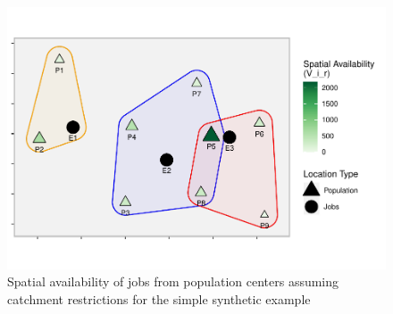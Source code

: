 \documentclass[]{elsarticle} %
\begin{document}
\begin{figure}
\includegraphics[width=1\linewidth]{Spatial-Availability_files/figure-latex/toy-example-availability-with-catchments-1} \caption{\label{fig:toy-example-availability-with-catchments}Spatial availability of jobs from population centers assuming catchment restrictions for the simple synthetic example}\label{fig:toy-example-availability-with-catchments}
\end{figure}
\end{document}
